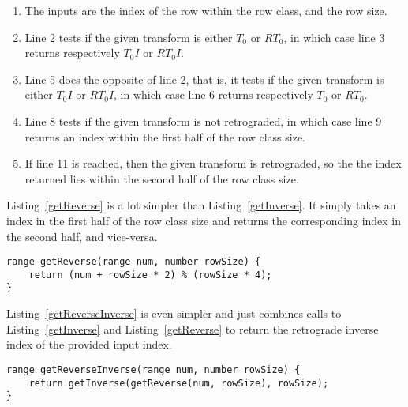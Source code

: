 \begin{enumerate}
\item The inputs are the index of the row within the row class, and the row size.
\item Line 2 tests if the given transform is either $T_0$ or $RT_0$, in which case line 3 returns respectively $T_0I$ or $RT_0I$.
\addtocounter{enumi}{2}
\item Line 5 does the opposite of line 2, that is, it tests if the given transform is either $T_0I$ or $RT_0I$, in which case line 6 returns respectively $T_0$ or $RT_0$.
\addtocounter{enumi}{2}
\item Line 8 tests if the given transform is not retrograded, in which case line 9 returns an index within the first half of the row class size.
\addtocounter{enumi}{2}
\item If line 11 is reached, then the given transform is retrograded, so the the index returned lies within the second half of the row class size.
\end{enumerate}

Listing~\ref{getReverse} is a lot simpler than Listing~\ref{getInverse}. It simply takes an index in the first half of the row class size and returns the corresponding index in the second half, and vice-versa.

\begin{lstlisting}[caption={Computing the index of the retrograde row within a row class.},label={getReverse}]
range getReverse(range num, number rowSize) {
    return (num + rowSize * 2) % (rowSize * 4);
}
\end{lstlisting}

Listing~\ref{getReverseInverse} is even simpler and just combines calls to Listing~\ref{getInverse} and Listing~\ref{getReverse} to return the retrograde inverse index of the provided input index.

\begin{lstlisting}[caption={Computing the index of the retrograde inverse row within a row class.},label={getReverseInverse}]
range getReverseInverse(range num, number rowSize) {
    return getInverse(getReverse(num, rowSize), rowSize);
}
\end{lstlisting}

